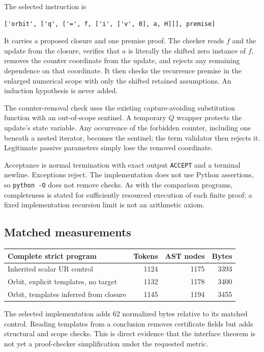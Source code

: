 \documentclass[11pt]{article}
\theoremstyle{definition}
\begin{document}
The selected instruction is
\begin{lstlisting}
['orbit', ['q', ['=', f, ['i', ['v', 0], a, H]]], premise]
\end{lstlisting}
It carries a proposed closure and one premise proof. The checker reads $f$ and the update from the closure, verifies that $a$ is literally the shifted zero instance of $f$, removes the counter coordinate from the update, and rejects any remaining dependence on that coordinate. It then checks the recurrence premise in the enlarged numerical scope with only the shifted retained assumptions. An induction hypothesis is never added.

The counter-removal check uses the existing capture-avoiding substitution function with an out-of-scope sentinel. A temporary $Q$ wrapper protects the update's state variable. Any occurrence of the forbidden counter, including one beneath a nested iterator, becomes the sentinel; the term validator then rejects it. Legitimate passive parameters simply lose the removed coordinate.

Acceptance is normal termination with exact output \texttt{ACCEPT} and a terminal newline. Exceptions reject. The implementation does not use Python assertions, so \texttt{python -O} does not remove checks. As with the comparison programs, completeness is stated for sufficiently resourced execution of each finite proof; a fixed implementation recursion limit is not an arithmetic axiom.

\subsection{Matched measurements}

\begin{center}
\begin{tabular}{lrrr}
\toprule
Complete strict program & Tokens & AST nodes & Bytes\\
\midrule
Inherited scalar UR control & 1124 & 1175 & 3393\\
Orbit, explicit templates, no target & 1132 & 1178 & 3400\\
Orbit, templates inferred from closure & 1145 & 1194 & 3455\\
\bottomrule
\end{tabular}
\end{center}

The selected implementation adds 62 normalized bytes relative to its matched control. Reading templates from a conclusion removes certificate fields but adds structural and scope checks. This is direct evidence that the interface theorem is not yet a proof-checker simplification under the requested metric.
\end{document}
